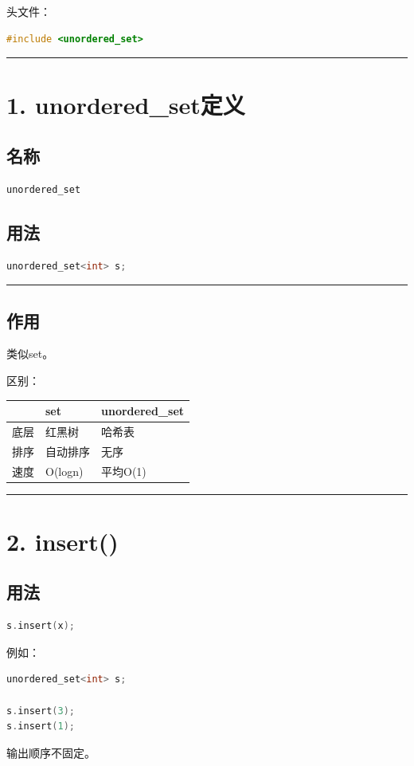\documentclass[10pt,twocolumn]{extarticle}
\begin{document}
头文件：
\begin{lstlisting}[language=C++]
#include <unordered_set>
\end{lstlisting}

\noindent\rule{\linewidth}{0.4pt}

\section{1. unordered\_set定义}

\subsection{名称}
\begin{lstlisting}[language=C++]
unordered_set
\end{lstlisting}

\subsection{用法}
\begin{lstlisting}[language=C++]
unordered_set<int> s;
\end{lstlisting}

\noindent\rule{\linewidth}{0.4pt}

\subsection{作用}
类似set。

区别：
\begin{table}[h]
\centering
\begin{tabular}{|l|l|l|}
\hline
 & set & unordered\_set \\ \hline
底层 & 红黑树 & 哈希表 \\ \hline
排序 & 自动排序 & 无序 \\ \hline
速度 & O(logn) & 平均O(1) \\ \hline
\end{tabular}
\end{table}

\noindent\rule{\linewidth}{0.4pt}

\section{2. insert()}

\subsection{用法}
\begin{lstlisting}[language=C++]
s.insert(x);
\end{lstlisting}
例如：
\begin{lstlisting}[language=C++]
unordered_set<int> s;

s.insert(3);
s.insert(1);
\end{lstlisting}
输出顺序不固定。
\end{document}
